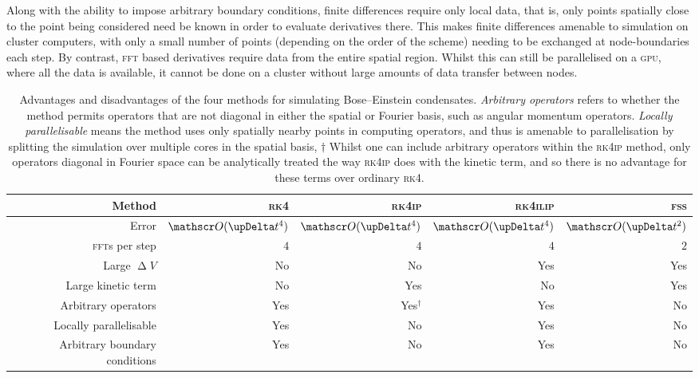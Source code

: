 Along with the ability to impose arbitrary boundary conditions, finite differences require only local data, that is, only points spatially close to the point being considered need be known in order to evaluate derivatives there. This makes finite differences amenable to simulation on cluster computers, with only a small number of points (depending on the order of the scheme) needing to be exchanged at node-boundaries each step. By contrast, \textsc{fft} based derivatives require data from the entire spatial region. Whilst this can still be parallelised on a \textsc{gpu}, where all the data is available, it cannot be done on a cluster without large amounts of data transfer between nodes.

\begin{table}
\centering
\begin{tabular}[c]{|r||rrrr|}
\hline
Method & \textsc{rk4} & \textsc{rk4ip} & \textsc{rk4ilip} & \textsc{fss} \\
\hline
Error & $\Ord{\upDelta t^4}$ & $\Ord{\upDelta t^4}$& $\Ord{\upDelta t^4}$ & $\Ord{\upDelta t^2}$\\
\textsc{fft}s per step & $4$ & $4$ & $4$ & $2$\\
Large $\upDelta V$ & No & No & Yes & Yes\\
Large kinetic term & No & Yes & No & Yes\\
Arbitrary operators & Yes & Yes$^\dagger$ & Yes & No\\
Locally parallelisable & Yes & No & Yes & No\\
Arbitrary boundary conditions & Yes & No & Yes & No\\
\hline
\end{tabular}
\caption{Advantages and disadvantages of the four methods for simulating Bose--Einstein condensates. \emph{Arbitrary operators} refers to whether the method permits operators that are not diagonal in either the spatial or Fourier basis, such as angular momentum operators. \emph{Locally parallelisable} means the method uses only spatially nearby points in computing operators, and thus is amenable to parallelisation by splitting the simulation over multiple cores in the spatial basis, $\dagger$ Whilst one can include arbitrary operators within the \textsc{rk4ip} method, only operators diagonal in Fourier space can be analytically treated the way \textsc{rk4ip} does with the kinetic term, and so there is no advantage for these terms over ordinary \textsc{rk4}.}\label{table:rk4ilip_methods}
\end{table}

